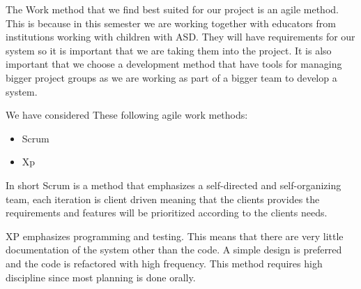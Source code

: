 The Work method that we find best suited for our project is an agile method. This is because in this semester we are working together with educators from institutions working with children with ASD. They will have requirements for our system so it is important that we are taking them into the project. It is also important that we choose a development method that have tools for managing bigger project groups as we are working as part of a bigger team to develop a system.

We have considered These following agile work methods:

\begin{itemize}
\item Scrum
\item Xp 
\end{itemize} 

In short Scrum is a method that emphasizes a self-directed and self-organizing team, each iteration is client driven meaning that the clients provides the requirements and features will be prioritized according to the clients needs.

XP emphasizes programming and testing. This means that there are very little documentation of the system other than the code. A simple design is preferred and the code is refactored with high frequency. This method requires high discipline since most planning is done orally.

